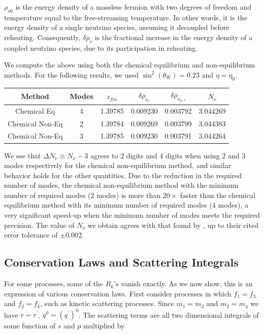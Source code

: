  $\rho_{\nu0}$ is the energy density of a massless fermion with two degrees of freedom and temperature equal to the free-streaming temperature.  In other words, it is the energy density of a single neutrino species, assuming it decoupled before reheating. Consequently, $\delta\bar\rho_\nu$ is the fractional increase in the energy density of a coupled neutrino species, due to its participation in reheating.

We compute the above using both the chemical equilibrium and non-equilibrium methods. For the following results, we used $\sin^2(\theta_W)=0.23$ and $\eta=\eta_0$. 
\begin{table}[ht]\label{table:method_comp}
\centering 
\begin{tabular}{|c|c|c|c|c|c|}
\hline
Method &Modes&$z_{fin}$ & $\delta\bar\rho_{\nu_e}$&   $\delta\bar\rho_{\nu_{\mu,\tau}}$ & $N_{\nu}$  \\
\hline
Chemical Eq& 4 &1.39785 &0.009230 &0.003792 &3.044269\\
\hline
Chemical Non-Eq& 2&1.39784 &0.009269 & 0.003799&3.044383 \\
\hline
Chemical Non-Eq& 3&1.39785&0.009230 & 0.003791&3.044264 \\
\hline
\end{tabular}
\end{table}
We see that $\Delta N_\nu\equiv N_\nu-3$ agrees to $2$ digits and $4$ digits when using $2$ and $3$ modes respectively for the chemical non-equilibrium method, and similar behavior holds for the other quantities. Due to the reduction in the required number of modes, the chemical non-equilibrium method with the minimum number of required modes ($2$ modes) is more than $20\times$ faster than the chemical equilibrium method with its minimum number of required modes ($4$ modes), a very significant speed-up when the minimum number of modes meets the required precision.  The value of $N_\nu$ we obtain agrees with that found by \cite{Mangano2005}, up to their cited error tolerance of $\pm 0.002$.

\subsection{Conservation Laws and Scattering Integrals}
For some processes, some of the $R_k$'s vanish exactly.  As we now show, this is an expression of various conservation laws. First consider processes in which $f_1=f_3$ and $f_2=f_4$, such as kinetic scattering processes. Since $m_1=m_3$ and $m_2=m_4$ we have $r=r^{'}$, $q^0=(q^{'})^0$.  The scattering terms are all two dimensional integrals of some function of $s$ and $p$ multiplied by 

